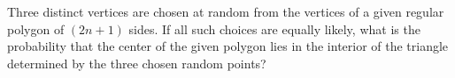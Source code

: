 Three distinct vertices are chosen at random from the vertices of a given regular polygon of $ (2n+1)$ sides. If all such choices are equally likely, what is the probability that the center of the given polygon lies in the interior of the triangle determined by the three chosen random points?
